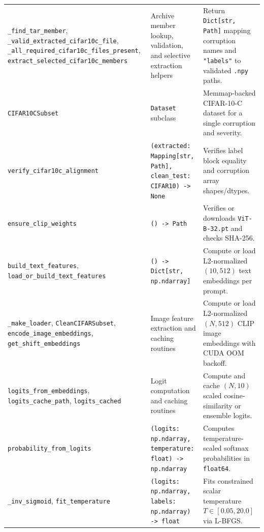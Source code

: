 \documentclass[11pt,a4paper]{article}
\begin{document}
{\begin{longtable}{P{0.30\textwidth} P{0.29\textwidth} P{0.34\textwidth}}
\texttt{\_\allowbreak{}find\_\allowbreak{}tar\_\allowbreak{}member}, \texttt{\_\allowbreak{}valid\_\allowbreak{}extracted\_\allowbreak{}cifar10c\_\allowbreak{}file}, \texttt{\_\allowbreak{}all\_\allowbreak{}required\_\allowbreak{}cifar10c\_\allowbreak{}files\_\allowbreak{}present}, \texttt{extract\_\allowbreak{}selected\_\allowbreak{}cifar10c\_\allowbreak{}members} & Archive member lookup, validation, and selective extraction helpers & Return \texttt{Dict[str, Path]} mapping corruption names and \texttt{"labels"} to validated \texttt{.npy} paths. \\
\texttt{CIFAR10CSubset} & \texttt{Dataset} subclass & Memmap-backed CIFAR-10-C dataset for a single corruption and severity. \\
\texttt{verify\_\allowbreak{}cifar10c\_\allowbreak{}alignment} & \texttt{(extracted: Mapping[str, Path], clean\_\allowbreak{}test: CIFAR10) -> None} & Verifies label block equality and corruption array shapes/dtypes. \\
\texttt{ensure\_\allowbreak{}clip\_\allowbreak{}weights} & \texttt{() -> Path} & Verifies or downloads \texttt{ViT-B-32.pt} and checks SHA-256. \\
\texttt{build\_\allowbreak{}text\_\allowbreak{}features}, \texttt{load\_\allowbreak{}or\_\allowbreak{}build\_\allowbreak{}text\_\allowbreak{}features} & \texttt{() -> Dict[str, np.ndarray]} & Compute or load L2-normalized $(10, 512)$ text embeddings per prompt. \\
\texttt{\_\allowbreak{}make\_\allowbreak{}loader}, \texttt{CleanCIFARSubset}, \texttt{encode\_\allowbreak{}image\_\allowbreak{}embeddings}, \texttt{get\_\allowbreak{}shift\_\allowbreak{}embeddings} & Image feature extraction and caching routines & Compute or load L2-normalized $(N, 512)$ CLIP image embeddings with CUDA OOM backoff. \\
\texttt{logits\_\allowbreak{}from\_\allowbreak{}embeddings}, \texttt{logits\_\allowbreak{}cache\_\allowbreak{}path}, \texttt{logits\_\allowbreak{}cached} & Logit computation and caching routines & Compute and cache $(N, 10)$ scaled cosine-similarity or ensemble logits. \\
\texttt{probability\_\allowbreak{}from\_\allowbreak{}logits} & \texttt{(logits: np.ndarray, temperature: float) -> np.ndarray} & Computes temperature-scaled softmax probabilities in \texttt{float64}. \\
\texttt{\_\allowbreak{}inv\_\allowbreak{}sigmoid}, \texttt{fit\_\allowbreak{}temperature} & \texttt{(logits: np.ndarray, labels: np.ndarray) -> float} & Fits constrained scalar temperature $T \in [0.05, 20.0]$ via L-BFGS. \\

\end{longtable}}
\end{document}
